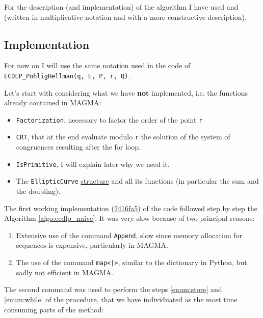 \documentclass{article}
\theoremstyle{plain}
\theoremstyle{remark}
\theoremstyle{definition}
\begin{document}
For the description (and implementation) of the algorithm I have used \linebreak
\cite[Section 5.2.3]{washington} and \cite[Section 7.2.3]{stinson} (written in multiplicative notation and with a more constructive description). 

\subsection{Implementation}

For now on I will use the same notation used in the code of\\ \texttt{ECDLP}\verb|_|\texttt{PohligHellman(q, E, P, r, Q)}.

Let's start with considering what we have \textbf{not} implemented, i.e. the functions already contained in MAGMA:
\begin{itemize}
	\item \verb|Factorization|, necessary to factor the order of the point \verb|r|
	\item \verb|CRT|, that at the end evaluate modulo \verb|r| the solution of the system  of congruences resulting after the for loop.
	\item \verb|IsPrimitive|, I will explain later why we need it.
	\item The \verb|EllipticCurve| \href{http://magma.maths.usyd.edu.au/magma/handbook/elliptic_curves}{structure} and all its functions (in particular the sum and the doubling). 
\end{itemize}

The first working implementation (\href{https://github.com/giacomoborin/project2_MAGMA/blob/2416fa58ca58ef91075fc4a52427d68a5fa182c1/ECDLP.mag}{2416fa5}) of the code followed step by step the Algorithm \ref{algo:ecdlp_naive}. It was very slow because of two principal reasons:
\begin{enumerate}
	\item \label{enum:append} Extensive use of the command \verb|Append|, slow since memory allocation for sequences is expensive, particularly in MAGMA.
	\item \label{enum:map} The use of the command \texttt{map<|>}, similar to the dictionary in Python, but sadly not efficient in MAGMA. 
\end{enumerate}
The second command was used to perform the steps \ref{enum:store} and \ref{enum:while} of the procedure, that we have individuated as the most time consuming parts of the method:
\end{document}
